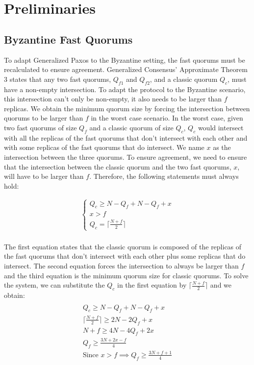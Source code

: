 \section{Preliminaries}

\subsection{Byzantine Fast Quorums}
To adapt Generalized Paxos to the Byzantine setting, the fast quorums must be recalculated to ensure agreement. Generalized Consensus' Approximate Theorem 3 states that any two fast quorums, $Q_{f1}$ and $Q_{f2}$, and a classic quorum $Q_c$, must have a non-empty intersection. To adapt the protocol to the Byzantine scenario, this intersection can't only be non-empty, it also needs to be larger than $f$ replicas. We obtain the minimum quorum size by forcing the intersection between quorums to be larger than $f$ in the worst case scenario. In the worst case, given two fast quorums of size $Q_f$ and a classic quorum of size $Q_c$, $Q_c$ would intersect with all the replicas of the fast quorums that don't intersect with each other and with some replicas of the fast quorums that do intersect. We name $x$ as the intersection between the three quorums. To ensure agreement, we need to ensure that the intersection between the classic quorum and the two fast quorums, $x$, will have to be larger than $f$. Therefore, the following statements must always hold:

\begin{gather*}
\begin{cases}
Q_c \geq N - Q_f + N-Q_f + x \\
x > f \\
Q_c = \lceil \frac{N+f}{2}\rceil
\end{cases} \\ 
\end{gather*}

The first equation states that the classic quorum is composed of the replicas of the fast quorums that don't intersect with each other plus some replicas that do intersect. The second equation forces the intersection to always be larger than $f$ and the third equation is the minimum quorum size for classic quorums. To solve the system, we can substitute the $Q_c$ in the first equation by $\lceil \frac{N+f}{2}\rceil$ and we obtain:
\begin{gather*} \\
Q_c \geq N - Q_f + N-Q_f + x \label{eq_1} \tag{1} \\ 
\lceil\frac{N+f}{2}\rceil \geq 2N - 2Q_f + x \label{eq_2} \tag{2} \\
N+f \geq 4N - 4Q_f + 2x \label{eq_3} \tag{3} \\
Q_f \geq \frac{3N+2x-f}{4} \label{eq_4} \tag{4} \\ 
\text{Since $x > f$} \implies Q_f \geq \frac{3N+f+1}{4} \label{eq_5} \tag{5}  \\
\end{gather*}

